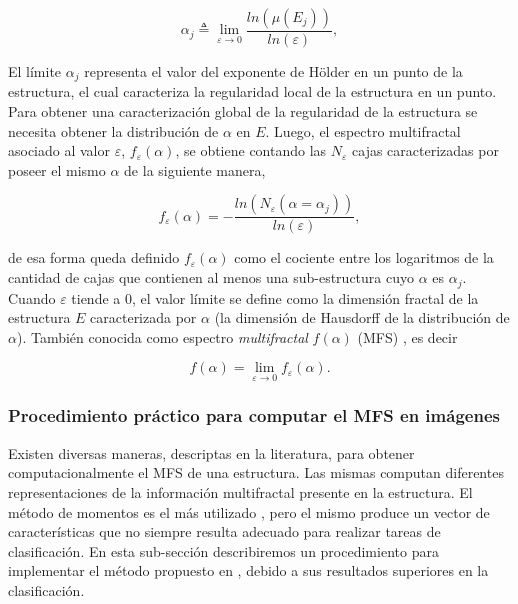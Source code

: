\begin{equation}
\alpha_{j} \triangleq \lim_{\varepsilon \rightarrow 0}{\frac{ln(\mu(E_{j}))}{ln(\varepsilon)} },
\label{eq:holder}
\end{equation}
\noindent

El límite $\alpha_{j}$ representa el valor del exponente de H\"older en un punto de la estructura, el cual caracteriza la regularidad local de la estructura en un punto.
Para obtener una caracterización global de la regularidad de la estructura se necesita obtener la distribución de $\alpha$ en $E$.
Luego, el espectro multifractal asociado al valor $\varepsilon$, $f_{\varepsilon}(\alpha)$, se obtiene contando las $N_{\varepsilon}$ cajas caracterizadas por poseer el mismo $\alpha$ de la siguiente manera,

\begin{equation}
f_{\varepsilon}(\alpha) = - \frac{ln(N_{\varepsilon}(\alpha = \alpha_{j}))}{ln(\varepsilon)}
\label{eq:eqn6},
\end{equation}

\noindent de esa forma queda definido $f_{\varepsilon}(\alpha)$ como el cociente entre los logaritmos de la cantidad de cajas que contienen al menos una sub-estructura cuyo $\alpha$ es $\alpha_{j}$.
Cuando $\varepsilon$ tiende a $0$, el valor límite se define como la dimensión fractal de la estructura $E$ caracterizada por $\alpha$ (la dimensión de Hausdorff de la distribución de $\alpha$).
También conocida como espectro {\em multifractal} $f(\alpha)$ (MFS) \cite{Silvetti2010}, es decir

\begin{equation}
f(\alpha) = \lim_{\varepsilon\to0}{f_{\varepsilon}(\alpha)}.
\label{eq:mfs}
\end{equation}

\subsubsection{Procedimiento práctico para computar el MFS en imágenes}
Existen diversas maneras, descriptas en la literatura, para obtener computacionalmente el MFS de una estructura.
Las mismas computan diferentes representaciones de la información multifractal presente en la estructura.
El método de momentos es el más utilizado \cite{Mendoza2010,Serrano2012}, pero el mismo produce un vector de características que no siempre resulta adecuado para realizar tareas de clasificación.
En esta sub-sección describiremos un procedimiento para implementar el método propuesto en \cite{Xu2009}, debido a sus resultados superiores en la clasificación.

